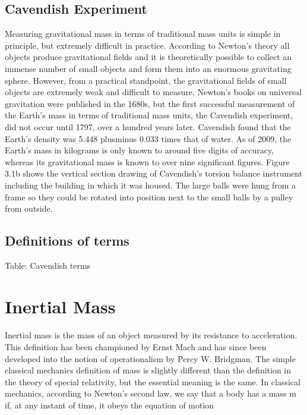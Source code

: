 \documentclass{book}
\begin{document}
	\subsection{Cavendish Experiment}
	Measuring gravitational mass in terms of traditional mass units is simple in principle, but extremely difficult in practice. According to Newton's theory all objects produce gravitational fields and it is theoretically possible to collect an immense number of small objects and form them into an enormous gravitating sphere. However, from a practical standpoint, the gravitational fields of small objects are extremely weak and difficult to measure. Newton's books on universal gravitation were published in the 1680s, but the first successful measurement of the Earth's mass in terms of traditional mass units, the Cavendish experiment, did not occur until 1797, over a hundred years later. Cavendish found that the Earth's density was 5.448 plusminus 0.033 times that of water. As of 2009, the Earth's mass in kilograms is only known to around five digits of accuracy, whereas its gravitational mass is known to over nine significant figures.  Figure 3.1b shows the vertical section drawing of Cavendish's torsion balance instrument including the building in which it was housed. The large balls were hung from a frame so they could be rotated into position next to the small balls by a pulley from outside.
	
	\subsection{Definitions of terms}
	Table: Cavendish terms
	
	\section{Inertial Mass}
	\paragraph{}
	Inertial mass is the mass of an object measured by its resistance to acceleration. This definition has been championed by Ernst Mach and has since been developed into the notion of operationalism by Percy W. Bridgman. The simple classical mechanics definition of mass is slightly different than the definition in the theory of special relativity, but the essential meaning is the same. In classical mechanics, according to Newton's second law, we say that a body has a mass m if, at any instant of time, it obeys the equation of motion
	
\end{document}
